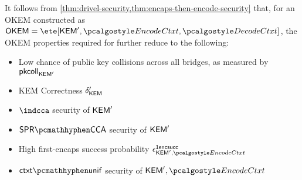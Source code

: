 \begin{corollary}
\label{cor:drivel-security-encaps-encode}
    It follows from \cref{thm:drivel-security,thm:encaps-then-encode-security} that, for an OKEM constructed as $\OKEM = \ete[\KEM', \encodectxt, \decodectxt]$, the OKEM properties required for \drivel{} further reduce to the following:
    \begin{itemize}
        \item Low chance of public key collisions across all bridges, as measured by $\mathsf{pkcoll}_{\mathsf{KEM}'}$
        \item KEM Correctness $\delta_{\mathsf{KEM}}'$
        \item $\indcca$ security of $\mathsf{KEM}'$
        \item $\sprcca$ security of $\mathsf{KEM}'$
        \item High first-encaps success probability $\epsilon^\firstencapssuccess_{\KEM',\encodectxt}$
        \item $\ctxtunif$ security of $\KEM',\encodectxt$
    \end{itemize}
\end{corollary}